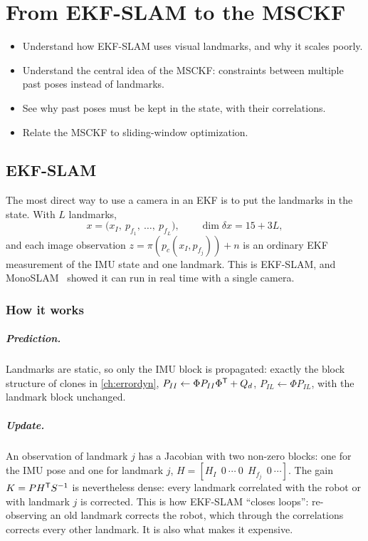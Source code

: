 \chapter{From EKF-SLAM to the MSCKF}
\label{ch:msckfintro}

\begin{objectives}
\begin{itemize}
  \item Understand how EKF-SLAM uses visual landmarks, and why it scales poorly.
  \item Understand the central idea of the MSCKF: constraints between multiple past poses instead of landmarks.
  \item See why past poses must be kept in the state, with their correlations.
  \item Relate the MSCKF to sliding-window optimization.
\end{itemize}
\end{objectives}

\section{EKF-SLAM}

The most direct way to use a camera in an EKF is to put the landmarks in the state. With $L$ landmarks,
\begin{equation}
  x = \big(x_I,\ p_{f_1},\ \dots,\ p_{f_L}\big), \qquad \dim\delta x = 15 + 3L,
\end{equation}
and each image observation $z = \pi(p_c(x_I, p_{f_j})) + n$ is an ordinary EKF measurement of the IMU state and one
landmark. This is EKF-SLAM, and MonoSLAM~\cite{davison2007monoslam} showed it can run in real time with a single camera.

\subsection{How it works}

\paragraph{Prediction.} Landmarks are static, so only the IMU block is propagated: exactly the block structure of clones in \cref{ch:errordyn},
$P_{II} \gets \Phi P_{II}\Phi^{\mathsf{T}} + Q_d$, $P_{IL} \gets \Phi P_{IL}$, with the landmark block unchanged.

\paragraph{Update.} An observation of landmark $j$ has a Jacobian with two non-zero blocks: one for the IMU pose and one for landmark $j$,
$H = [H_I\ \ 0\ \cdots\ 0\ \ H_{f_j}\ \ 0\ \cdots]$. The gain $K = PH^{\mathsf{T}} S^{-1}$ is nevertheless dense: every landmark correlated with the robot or with landmark $j$ is corrected.
This is how EKF-SLAM ``closes loops'': re-observing an old landmark corrects the robot, which through the correlations corrects every other landmark. It is also
what makes it expensive.

